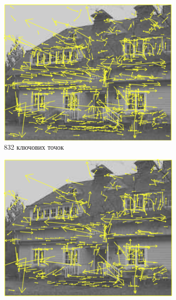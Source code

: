 \begin{enumerate}
          \begin{figure}[H]
              \centering
              \ContinuedFloat
              \begin{subfigure}[c]{0.3\textwidth}
                  \centering
                  \includegraphics[width=\textwidth]{images/sift4}
                  \caption{ 832 ключових точок
                      \label{fig:swift4}
                  }
              \end{subfigure}
              \begin{subfigure}[c]{0.3\textwidth}
                  \centering
                  \includegraphics[width=\textwidth]{images/sift5}

\end{subfigure}
\end{figure}
\end{enumerate}
